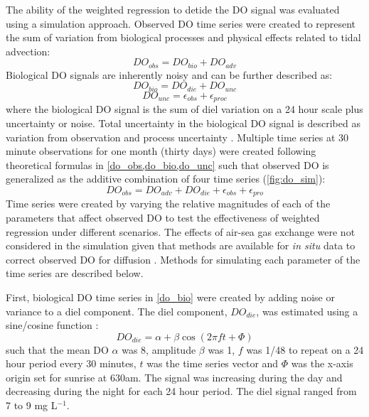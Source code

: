 \documentclass[letterpaper,12pt,oneside]{article}\usepackage[]{graphicx}\usepackage[]{color}
\begin{document}
The ability of the weighted regression to detide the \ac{DO} signal was evaluated using a simulation approach.  Observed \ac{DO} time series were created to represent the sum of variation from biological processes and physical effects related to tidal advection:  
\begin{equation} \label{do_obs}
DO_{obs} = DO_{bio} + DO_{adv}
\end{equation}
Biological \ac{DO} signals are inherently noisy \citep{Batt12} and can be further described as:
\begin{equation} \label{do_bio} 
DO_{bio} = DO_{die} + DO_{unc}
\end{equation} 
\begin{equation} \label{do_unc}
DO_{unc} = \epsilon_{obs} + \epsilon_{proc}
\end{equation}
where the biological \ac{DO} signal is the sum of diel variation on a 24 hour scale plus uncertainty or noise.  Total uncertainty in the biological \ac{DO} signal is described as variation from observation and process uncertainty \citep{Hilborn97}.  Multiple time series at 30 minute observations for one month (thirty days) were created following theoretical formulas in \cref{do_obs,do_bio,do_unc} such that observed \ac{DO} is generalized as the additive combination of four time series (\cref{fig:do_sim}):
\begin{equation} \label{do_obs_all}
DO_{obs} = DO_{adv} + DO_{die} + \epsilon_{obs} + \epsilon_{pro}
\end{equation}
Time series were created by varying the relative magnitudes of each of the parameters that affect observed \ac{DO} to test the effectiveness of weighted regression under different scenarios.  The effects of air-sea gas exchange were not considered in the simulation given that methods are available for \textit{in situ} data to correct observed \ac{DO} for diffusion \citep[i.e., ][]{Thebault08}.  Methods for simulating each parameter of the time series are described below. 

First, biological \ac{DO} time series in \cref{do_bio} were created by adding noise or variance to a diel component.  The diel component, $DO_{die}$, was estimated using a sine/cosine function \citep{Cryer08}:
\begin{equation} \label{do_sin}
DO_{die} = \alpha + \beta\cos\left(2\pi ft + \Phi\right)
\end{equation}
such that the mean DO $\alpha$ was 8, amplitude $\beta$ was 1, $f$ was 1/48 to repeat on a 24 hour period every 30 minutes, $t$ was the time series vector and $\Phi$ was the x-axis origin set for sunrise at 630am.  The signal was increasing during the day and decreasing during the night for each 24 hour period.  The diel signal ranged from 7 to 9 mg L$^{-1}$.
\end{document}
